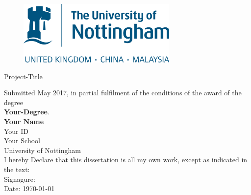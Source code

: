 

\begin{titlepage}
  \begin{figure}[H]
    \centering
    \includegraphics[width=0.7\textwidth]{University_of_Nottingham}
  \end{figure}

  \center

  {\Huge \color{blue} Project-Title\\[1cm]}

  
  Submitted May 2017, in partial fulfilment of the conditions of the
  award of the degree \\
  {\color{blue}\textbf{Your-Degree}}.\\[1cm]

  {\Large \textbf{Your Name}}\\[1cm]

  {\Large Your ID}\\[1cm]

  {\Large Your School}\\[1cm]

  {\Large University of Nottingham}\\[1cm]

  I hereby Declare that this dissertation is all my own work, except
  as indicated in the text:\\[1cm]

  Signagure: \underline{\hspace{6cm}}\\[1cm]

  Date: \today

  \vfill
\end{titlepage}
\newpage

